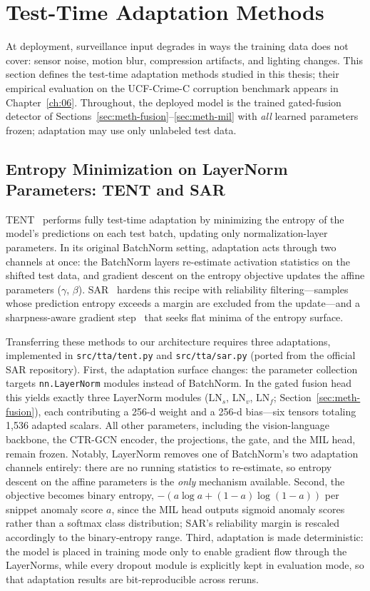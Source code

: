 \section{Test-Time Adaptation Methods}
\label{sec:meth-tta}

At deployment, surveillance input degrades in ways the training data does not cover: sensor
noise, motion blur, compression artifacts, and lighting changes. This section defines the
test-time adaptation methods studied in this thesis; their empirical evaluation on the
UCF-Crime-C corruption benchmark appears in Chapter~\ref{ch:06}. Throughout, the deployed model
is the trained gated-fusion detector of Sections~\ref{sec:meth-fusion}--\ref{sec:meth-mil} with
\emph{all} learned parameters frozen; adaptation may use only unlabeled test data.

\subsection{Entropy Minimization on LayerNorm Parameters: TENT and SAR}
\label{sec:meth-tta-entropy}

TENT~\cite{wang2021tent} performs fully test-time adaptation by minimizing the entropy of the
model's predictions on each test batch, updating only normalization-layer parameters. In its
original BatchNorm setting, adaptation acts through two channels at once: the BatchNorm layers
re-estimate activation statistics on the shifted test data, and gradient descent on the entropy
objective updates the affine parameters ($\gamma$, $\beta$). SAR~\cite{niu2023sar} hardens this
recipe with reliability filtering---samples whose prediction entropy exceeds a margin are
excluded from the update---and a sharpness-aware gradient step~\cite{foret2021sam} that seeks
flat minima of the entropy surface.

Transferring these methods to our architecture requires three adaptations, implemented in
\texttt{src/tta/tent.py} and \texttt{src/tta/sar.py} (ported from the official SAR repository).
First, the adaptation surface changes: the parameter collection targets \texttt{nn.LayerNorm}
modules instead of BatchNorm. In the gated fusion head this yields exactly three LayerNorm
modules ($\text{LN}_s$, $\text{LN}_v$, $\text{LN}_f$; Section~\ref{sec:meth-fusion}), each
contributing a 256-d weight and a 256-d bias---six tensors totaling 1{,}536 adapted scalars. All
other parameters, including the vision-language backbone, the CTR-GCN encoder, the projections,
the gate, and the MIL head, remain frozen. Notably, LayerNorm removes one of BatchNorm's two
adaptation channels entirely: there are no running statistics to re-estimate, so entropy descent
on the affine parameters is the \emph{only} mechanism available. Second, the objective becomes
binary entropy, $-(a\log a + (1-a)\log(1-a))$ per snippet anomaly score $a$, since the MIL head outputs
sigmoid anomaly scores rather than a softmax class distribution; SAR's reliability margin is
rescaled accordingly to the binary-entropy range. Third, adaptation is made deterministic: the
model is placed in training mode only to enable gradient flow through the LayerNorms, while
every dropout module is explicitly kept in evaluation mode, so that adaptation results are
bit-reproducible across reruns.

